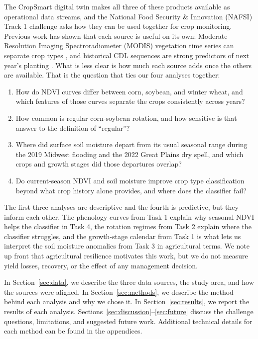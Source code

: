 \documentclass[10pt,letterpaper]{article}
\begin{document}
The CropSmart digital twin makes all three of these products available as operational data streams, and the National Food Security \& Innovation (NAFSI) Track 1 challenge asks how they can be used together for crop monitoring. Previous work has shown that each source is useful on its own: Moderate Resolution Imaging Spectroradiometer (MODIS) vegetation time series can separate crop types \citep{wardlow2007modis}, and historical CDL sequences are strong predictors of next year's planting \citep{zhang2019cropprediction}. What is less clear is how much each source adds once the others are available. That is the question that ties our four analyses together:

\begin{enumerate}

\item How do NDVI curves differ between corn, soybean, and winter wheat, and which features of those curves separate the crops consistently across years?

\item How common is regular corn-soybean rotation, and how sensitive is that answer to the definition of ``regular''?

\item Where did surface soil moisture depart from its usual seasonal range during the 2019 Midwest flooding and the 2022 Great Plains dry spell, and which crops and growth stages did those departures overlap?

\item Do current-season NDVI and soil moisture improve crop type classification beyond what crop history alone provides, and where does the classifier fail?

\end{enumerate}

The first three analyses are descriptive and the fourth is predictive, but they inform each other. The phenology curves from Task 1 explain why seasonal NDVI helps the classifier in Task 4, the rotation regimes from Task 2 explain where the classifier struggles, and the growth-stage calendar from Task 1 is what lets us interpret the soil moisture anomalies from Task 3 in agricultural terms. We note up front that agricultural resilience motivates this work, but we do not measure yield losses, recovery, or the effect of any management decision.

In Section~\ref{sec:data}, we describe the three data sources, the study area, and how the sources were aligned. In Section~\ref{sec:methods}, we describe the method behind each analysis and why we chose it. In Section~\ref{sec:results}, we report the results of each analysis. Sections~\ref{sec:discussion}--\ref{sec:future} discuss the challenge questions, limitations, and suggested future work. Additional technical details for each method can be found in the appendices.
\end{document}
